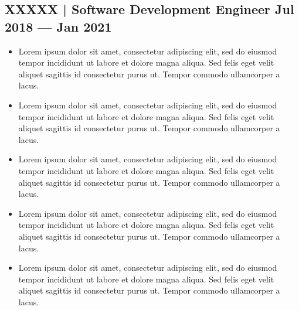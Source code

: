 \documentclass[a4,10pt]{article}
\newcommand{\subtext}[1]{
#1\par\vspace{-0.2cm}}
\newenvironment{zitemize}{
\begin{itemize}\itemsep0pt \parskip0pt \parsep1pt}
{\end{itemize}\vspace{-0.5cm}}
\begin{document}
\subsection*{XXXXX | Software Development Engineer \hfill Jul 2018 --- Jan 2021} 
\vspace{0.2cm}
\subtext{}
    \begin{zitemize}
        \item {Lorem ipsum dolor sit amet, consectetur adipiscing elit, sed do eiusmod tempor incididunt ut labore et dolore magna aliqua. Sed felis eget velit aliquet sagittis id consectetur purus ut. Tempor commodo ullamcorper a lacus.}
        \item { Lorem ipsum dolor sit amet, consectetur adipiscing elit, sed do eiusmod tempor incididunt ut labore et dolore magna aliqua. Sed felis eget velit aliquet sagittis id consectetur purus ut. Tempor commodo ullamcorper a lacus. }
         \item {Lorem ipsum dolor sit amet, consectetur adipiscing elit, sed do eiusmod tempor incididunt ut labore et dolore magna aliqua. Sed felis eget velit aliquet sagittis id consectetur purus ut. Tempor commodo ullamcorper a lacus.}
          \item { Lorem ipsum dolor sit amet, consectetur adipiscing elit, sed do eiusmod tempor incididunt ut labore et dolore magna aliqua. Sed felis eget velit aliquet sagittis id consectetur purus ut. Tempor commodo ullamcorper a lacus. }
         \item {Lorem ipsum dolor sit amet, consectetur adipiscing elit, sed do eiusmod tempor incididunt ut labore et dolore magna aliqua. Sed felis eget velit aliquet sagittis id consectetur purus ut. Tempor commodo ullamcorper a lacus.}
        


       
    \end{zitemize}


\end{document}
